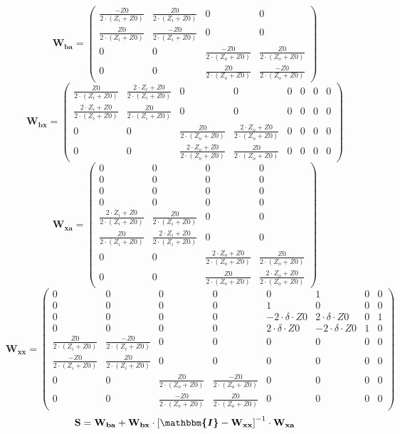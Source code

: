 \[ \mathbf{W_{ba}} = \left(\begin{smallmatrix} \frac{-Z0}{2\cdot
(Z_i+Z0 )} & \frac{Z0}{2\cdot  (Z_i+Z0 )} & 0 & 0 \\ \frac{Z0}{2\cdot
(Z_i+Z0 )} & \frac{-Z0}{2\cdot  (Z_i+Z0 )} & 0 & 0 \\ 0 & 0 &
\frac{-Z0}{2\cdot  (Z_o+Z0 )} & \frac{Z0}{2\cdot  (Z_o+Z0 )} \\ 0 & 0
& \frac{Z0}{2\cdot  (Z_o+Z0 )} & \frac{-Z0}{2\cdot  (Z_o+Z0 )}
\end{smallmatrix}\right) \]
\[ \mathbf{W_{bx}} = \left(\begin{smallmatrix} \frac{Z0}{2\cdot
(Z_i+Z0 )} & \frac{2\cdot Z_i+Z0}{2\cdot  (Z_i+Z0 )} & 0 & 0 & 0 & 0 &
0 & 0 \\ \frac{2\cdot Z_i+Z0}{2\cdot  (Z_i+Z0 )} & \frac{Z0}{2\cdot
(Z_i+Z0 )} & 0 & 0 & 0 & 0 & 0 & 0 \\ 0 & 0 & \frac{Z0}{2\cdot
(Z_o+Z0 )} & \frac{2\cdot Z_o+Z0}{2\cdot  (Z_o+Z0 )} & 0 & 0 & 0 & 0
\\ 0 & 0 & \frac{2\cdot Z_o+Z0}{2\cdot  (Z_o+Z0 )} & \frac{Z0}{2\cdot
(Z_o+Z0 )} & 0 & 0 & 0 & 0 \end{smallmatrix}\right) \]
\[ \mathbf{W_{xa}} = \left(\begin{smallmatrix} 0 & 0 & 0 & 0 \\ 0 & 0
& 0 & 0 \\ 0 & 0 & 0 & 0 \\ 0 & 0 & 0 & 0 \\ \frac{2\cdot
Z_i+Z0}{2\cdot  (Z_i+Z0 )} & \frac{Z0}{2\cdot  (Z_i+Z0 )} & 0 & 0 \\
\frac{Z0}{2\cdot  (Z_i+Z0 )} & \frac{2\cdot Z_i+Z0}{2\cdot  (Z_i+Z0 )}
& 0 & 0 \\ 0 & 0 & \frac{2\cdot Z_o+Z0}{2\cdot  (Z_o+Z0 )} &
\frac{Z0}{2\cdot  (Z_o+Z0 )} \\ 0 & 0 & \frac{Z0}{2\cdot  (Z_o+Z0 )} &
\frac{2\cdot Z_o+Z0}{2\cdot  (Z_o+Z0 )} \end{smallmatrix}\right) \]
\[ \mathbf{W_{xx}} = \left(\begin{smallmatrix} 0 & 0 & 0 & 0 & 0 & 1 &
0 & 0 \\ 0 & 0 & 0 & 0 & 1 & 0 & 0 & 0 \\ 0 & 0 & 0 & 0 & -2\cdot
\delta \cdot Z0 & 2\cdot \delta \cdot Z0 & 0 & 1 \\ 0 & 0 & 0 & 0 &
2\cdot \delta \cdot Z0 & -2\cdot \delta \cdot Z0 & 1 & 0 \\
\frac{Z0}{2\cdot  (Z_i+Z0 )} & \frac{-Z0}{2\cdot  (Z_i+Z0 )} & 0 & 0 &
0 & 0 & 0 & 0 \\ \frac{-Z0}{2\cdot  (Z_i+Z0 )} & \frac{Z0}{2\cdot
(Z_i+Z0 )} & 0 & 0 & 0 & 0 & 0 & 0 \\ 0 & 0 & \frac{Z0}{2\cdot
(Z_o+Z0 )} & \frac{-Z0}{2\cdot  (Z_o+Z0 )} & 0 & 0 & 0 & 0 \\ 0 & 0 &
\frac{-Z0}{2\cdot  (Z_o+Z0 )} & \frac{Z0}{2\cdot  (Z_o+Z0 )} & 0 & 0 &
0 & 0 \end{smallmatrix}\right) \]
\[ \mathbf{S}=\mathbf{W_{ba}}+\mathbf{W_{bx}}\cdot\left[
\boldsymbol{\mathbbm{I}}
-\mathbf{W_{xx}}\right]^{-1}\cdot\mathbf{W_{xa}} \]

